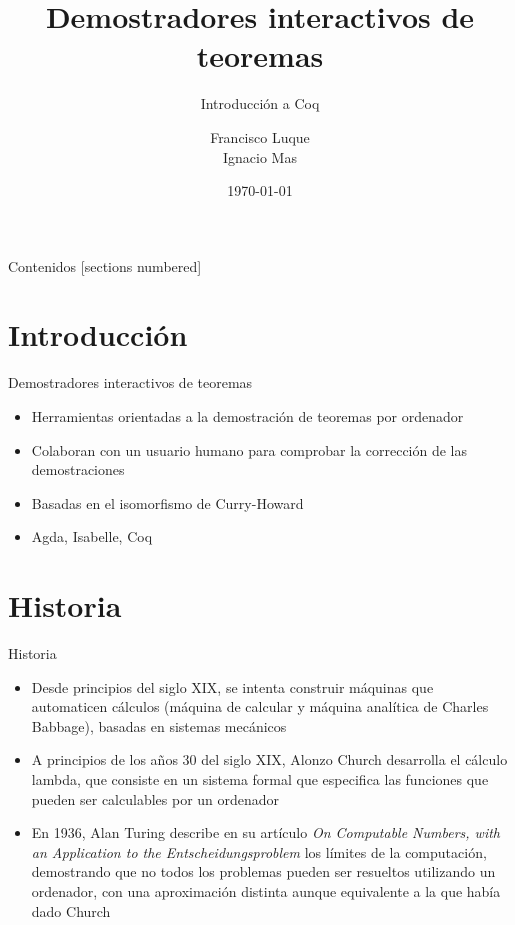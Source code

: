 \documentclass[10pt]{beamer}
\title{Demostradores interactivos de teoremas}
\subtitle{Introducción a Coq}
\date{\today}
\author{Francisco Luque \\ Ignacio Mas}
\institute{Universidad de Granada}
\begin{document}
\maketitle

\begin{frame}{Contenidos}
  [sections numbered]
  \tableofcontents[hideallsubsections]
\end{frame}

\section{Introducción}

\begin{frame}{Demostradores interactivos de teoremas}

  \begin{itemize}
  \item Herramientas orientadas a la demostración de teoremas por
    ordenador
  \item Colaboran con un usuario humano para comprobar la corrección
    de las demostraciones
  \item Basadas en el isomorfismo de Curry-Howard
  \item Agda, Isabelle, Coq
  \end{itemize}

\end{frame}

\section{Historia}

\begin{frame}[fragile]{Historia}

  \begin{itemize}
  \item Desde principios del siglo XIX, se intenta construir máquinas
    que automaticen cálculos (máquina de calcular y máquina analítica
    de Charles Babbage), basadas en sistemas mecánicos
  \item A principios de los años 30 del siglo XIX, Alonzo Church
    desarrolla el cálculo lambda, que consiste en un sistema formal
    que especifica las funciones que pueden ser calculables por un
    ordenador
  \item En 1936, Alan Turing describe en su artículo \textit{On
      Computable Numbers, with an Application to the
      Entscheidungsproblem} los límites de la computación, demostrando
    que no todos los problemas pueden ser resueltos utilizando un
    ordenador, con una aproximación distinta aunque equivalente a la
    que había dado Church
  \end{itemize}

\end{frame}
\end{document}
